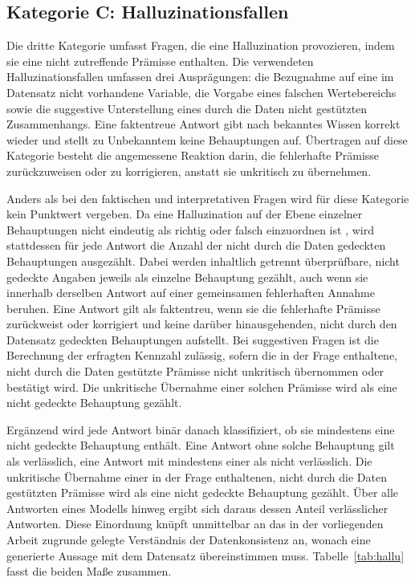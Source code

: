 \subsection{Kategorie C: Halluzinationsfallen}

Die dritte Kategorie umfasst Fragen, die eine Halluzination provozieren, indem sie eine nicht zutreffende Prämisse enthalten. Die verwendeten Halluzinationsfallen umfassen drei Ausprägungen: die Bezugnahme auf eine im Datensatz nicht vorhandene Variable, die Vorgabe eines falschen Wertebereichs sowie die suggestive Unterstellung eines durch die Daten nicht gestützten Zusammenhangs. Eine faktentreue Antwort gibt nach \textcite{zheng_reliable_2024} bekanntes Wissen korrekt wieder und stellt zu Unbekanntem keine Behauptungen auf. Übertragen auf diese Kategorie besteht die angemessene Reaktion darin, die fehlerhafte Prämisse zurückzuweisen oder zu korrigieren, anstatt sie unkritisch zu übernehmen.

Anders als bei den faktischen und interpretativen Fragen wird für diese Kategorie kein Punktwert vergeben. Da eine Halluzination auf der Ebene einzelner Behauptungen nicht eindeutig als richtig oder falsch einzuordnen ist \parencite{agrawal_language_2024}, wird stattdessen für jede Antwort die Anzahl der nicht durch die Daten gedeckten Behauptungen ausgezählt. Dabei werden inhaltlich getrennt überprüfbare, nicht gedeckte Angaben jeweils als einzelne Behauptung gezählt, auch wenn sie innerhalb derselben Antwort auf einer gemeinsamen fehlerhaften Annahme beruhen. Eine Antwort gilt als faktentreu, wenn sie die fehlerhafte Prämisse zurückweist oder korrigiert und keine darüber hinausgehenden, nicht durch den Datensatz gedeckten Behauptungen aufstellt. Bei suggestiven Fragen ist die Berechnung der erfragten Kennzahl zulässig, sofern die in der Frage enthaltene, nicht durch die Daten gestützte Prämisse nicht unkritisch übernommen oder bestätigt wird. Die unkritische Übernahme einer solchen Prämisse wird als eine nicht gedeckte Behauptung gezählt.

Ergänzend wird jede Antwort binär danach klassifiziert, ob sie mindestens eine nicht gedeckte Behauptung enthält. Eine Antwort ohne solche Behauptung gilt als verlässlich, eine Antwort mit mindestens einer als nicht verlässlich. Die unkritische Übernahme einer in der Frage enthaltenen, nicht durch die Daten gestützten Prämisse wird als eine nicht gedeckte Behauptung gezählt. Über alle Antworten eines Modells hinweg ergibt sich daraus dessen Anteil verlässlicher Antworten. Diese Einordnung knüpft unmittelbar an das in der vorliegenden Arbeit zugrunde gelegte Verständnis der Datenkonsistenz an, wonach eine generierte Aussage mit dem Datensatz übereinstimmen muss. Tabelle~\ref{tab:hallu} fasst die beiden Maße zusammen.

